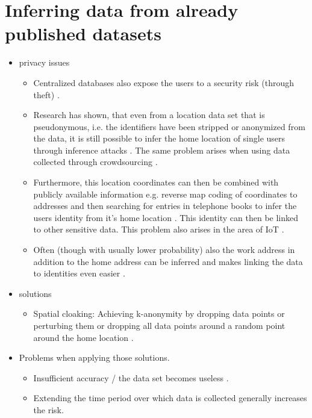 \section{Inferring data from already published datasets}
\begin{itemize}
	\item privacy issues
	\begin{itemize}
		\item Centralized databases also expose the users to a security risk (through theft) \parencite{iot, hoh2006enhancing}.
		\item Research has shown, that even from a location data set that is pseudonymous, i.e. the identifiers have been stripped or anonymized from the data, it is still possible to infer the home location of single users through inference attacks \parencite{krumm, cellphone, privacy-home-work-pairs, hoh2006enhancing, twitter}. The same problem arises when using data collected through crowdsourcing \parencite{crowdsourcing}.
		\item Furthermore, this location coordinates can then be combined with publicly available information e.g. reverse map coding of coordinates to addresses and then searching for entries in telephone books to infer the users identity from it's home location \parencite{krumm, privacy-home-work-pairs, hoh2006enhancing}. This identity can then be linked to other sensitive data. This problem also arises in the area of IoT \parencite{iot, hoh2006enhancing}.
		\item Often (though with usually lower probability) also the work address in addition to the home address can be inferred and makes linking the data to identities even easier \parencite{cellphone, privacy-home-work-pairs}.
	\end{itemize}
	\item solutions
	\begin{itemize}
		\item Spatial cloaking: Achieving k-anonymity by dropping data points or perturbing them or dropping all data points around a random point around the home location \parencite{krumm}.
	\end{itemize}
	\item Problems when applying those solutions.
	\begin{itemize}
		\item Insufficient accuracy / the data set becomes useless \parencite{krumm, cellphone, k-anonymity-old, k-anonymity, k-anonymity-achieving}.
		\item Extending the time period over which data is collected generally increases the risk.

\end{itemize}
\end{itemize}
